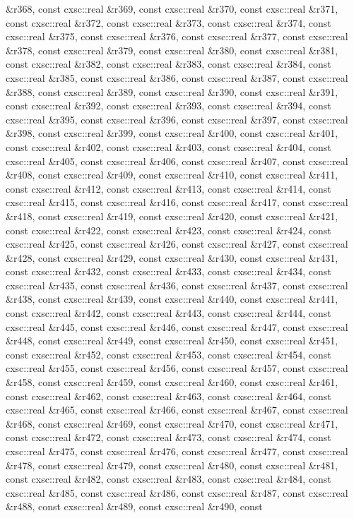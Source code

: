 \begin{DoxyCompactItemize}
\&r368, const cxsc\-::real \&r369, const cxsc\-::real \&r370, const cxsc\-::real \&r371, const cxsc\-::real \&r372, const cxsc\-::real \&r373, const cxsc\-::real \&r374, const cxsc\-::real \&r375, const cxsc\-::real \&r376, const cxsc\-::real \&r377, const cxsc\-::real \&r378, const cxsc\-::real \&r379, const cxsc\-::real \&r380, const cxsc\-::real \&r381, const cxsc\-::real \&r382, const cxsc\-::real \&r383, const cxsc\-::real \&r384, const cxsc\-::real \&r385, const cxsc\-::real \&r386, const cxsc\-::real \&r387, const cxsc\-::real \&r388, const cxsc\-::real \&r389, const cxsc\-::real \&r390, const cxsc\-::real \&r391, const cxsc\-::real \&r392, const cxsc\-::real \&r393, const cxsc\-::real \&r394, const cxsc\-::real \&r395, const cxsc\-::real \&r396, const cxsc\-::real \&r397, const cxsc\-::real \&r398, const cxsc\-::real \&r399, const cxsc\-::real \&r400, const cxsc\-::real \&r401, const cxsc\-::real \&r402, const cxsc\-::real \&r403, const cxsc\-::real \&r404, const cxsc\-::real \&r405, const cxsc\-::real \&r406, const cxsc\-::real \&r407, const cxsc\-::real \&r408, const cxsc\-::real \&r409, const cxsc\-::real \&r410, const cxsc\-::real \&r411, const cxsc\-::real \&r412, const cxsc\-::real \&r413, const cxsc\-::real \&r414, const cxsc\-::real \&r415, const cxsc\-::real \&r416, const cxsc\-::real \&r417, const cxsc\-::real \&r418, const cxsc\-::real \&r419, const cxsc\-::real \&r420, const cxsc\-::real \&r421, const cxsc\-::real \&r422, const cxsc\-::real \&r423, const cxsc\-::real \&r424, const cxsc\-::real \&r425, const cxsc\-::real \&r426, const cxsc\-::real \&r427, const cxsc\-::real \&r428, const cxsc\-::real \&r429, const cxsc\-::real \&r430, const cxsc\-::real \&r431, const cxsc\-::real \&r432, const cxsc\-::real \&r433, const cxsc\-::real \&r434, const cxsc\-::real \&r435, const cxsc\-::real \&r436, const cxsc\-::real \&r437, const cxsc\-::real \&r438, const cxsc\-::real \&r439, const cxsc\-::real \&r440, const cxsc\-::real \&r441, const cxsc\-::real \&r442, const cxsc\-::real \&r443, const cxsc\-::real \&r444, const cxsc\-::real \&r445, const cxsc\-::real \&r446, const cxsc\-::real \&r447, const cxsc\-::real \&r448, const cxsc\-::real \&r449, const cxsc\-::real \&r450, const cxsc\-::real \&r451, const cxsc\-::real \&r452, const cxsc\-::real \&r453, const cxsc\-::real \&r454, const cxsc\-::real \&r455, const cxsc\-::real \&r456, const cxsc\-::real \&r457, const cxsc\-::real \&r458, const cxsc\-::real \&r459, const cxsc\-::real \&r460, const cxsc\-::real \&r461, const cxsc\-::real \&r462, const cxsc\-::real \&r463, const cxsc\-::real \&r464, const cxsc\-::real \&r465, const cxsc\-::real \&r466, const cxsc\-::real \&r467, const cxsc\-::real \&r468, const cxsc\-::real \&r469, const cxsc\-::real \&r470, const cxsc\-::real \&r471, const cxsc\-::real \&r472, const cxsc\-::real \&r473, const cxsc\-::real \&r474, const cxsc\-::real \&r475, const cxsc\-::real \&r476, const cxsc\-::real \&r477, const cxsc\-::real \&r478, const cxsc\-::real \&r479, const cxsc\-::real \&r480, const cxsc\-::real \&r481, const cxsc\-::real \&r482, const cxsc\-::real \&r483, const cxsc\-::real \&r484, const cxsc\-::real \&r485, const cxsc\-::real \&r486, const cxsc\-::real \&r487, const cxsc\-::real \&r488, const cxsc\-::real \&r489, const cxsc\-::real \&r490, const 
\end{DoxyCompactItemize}
